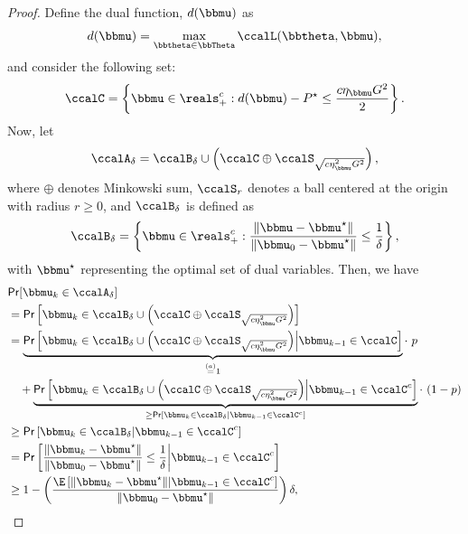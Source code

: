 \begin{proof}
Define the dual function, $d(\bbmu)$ as
\begin{align}\label{eq:def_dual_function}
d(\bbmu) = \max_{\bbtheta\in\bbTheta} \ccalL(\bbtheta, \bbmu),
\end{align}
and consider the following set:
\begin{align}\label{eq:def_C}
\ccalC = \left\{\bbmu \in \reals_+^c : d(\bbmu) - P^{\star} \leq \frac{c\eta_{\bbmu}G^2}{2} \right\}.
\end{align}
Now, let
\begin{align}
\ccalA_{\delta} = \ccalB_{\delta} \cup \left(\ccalC \oplus \ccalS_{\sqrt{c\eta_{\bbmu}^2 G^2}}\right),
\end{align}
where $\oplus$ denotes Minkowski sum, $\ccalS_r$ denotes a ball centered at the origin with radius $r\geq0$, and $\ccalB_{\delta}$ is defined as
\begin{align}
\ccalB_{\delta} = \left\{\bbmu \in \reals_+^c : \frac{\| \bbmu - \bbmu^{\star} \|}{\| \bbmu_0 - \bbmu^{\star}\|} \leq \frac{1}{\delta} \right\},
\end{align}
with $\bbmu^{\star}$ representing the optimal set of dual variables. Then, we have
\begin{align}
&\mathsf{Pr}[\bbmu_k \in \ccalA_{\delta}] \nonumber \\
& = \mathsf{Pr}\left[\bbmu_k \in \ccalB_{\delta} \cup \left(\ccalC \oplus \ccalS_{\sqrt{c\eta_{\bbmu}^2 G^2}}\right) \right] \\
& = \underbrace{\mathsf{Pr}\left[\bbmu_k \in \ccalB_{\delta} \cup \left(\ccalC \oplus \ccalS_{\sqrt{c\eta_{\bbmu}^2 G^2}}\right) \middle| \bbmu_{k-1}\in\ccalC \right]}_{\overset{(a)}{=}1} \cdot \ p \nonumber \\
& \quad + \underbrace{\mathsf{Pr}\left[\bbmu_k \in \ccalB_{\delta} \cup \left(\ccalC \oplus \ccalS_{\sqrt{c\eta_{\bbmu}^2 G^2}}\right) \middle| \bbmu_{k-1}\in\ccalC^c \right]}_{\geq \mathsf{Pr}\left[\bbmu_k \in \ccalB_{\delta}  \middle| \bbmu_{k-1}\in\ccalC^c \right]} \cdot \ (1-p) \nonumber \\
& \geq \mathsf{Pr}\left[\bbmu_k \in \ccalB_{\delta}  \middle| \bbmu_{k-1}\in\ccalC^c \right] \\
& = \mathsf{Pr}\left[\frac{\| \bbmu_k - \bbmu^{\star} \|}{\| \bbmu_0 - \bbmu^{\star}\|} \leq \frac{1}{\delta}  \middle| \bbmu_{k-1}\in\ccalC^c \right] \\
& \geq 1 - \left( \frac{\E\left[\| \bbmu_k - \bbmu^{\star} \| \middle| \bbmu_{k-1}\in\ccalC^c\right]}{\| \bbmu_0 - \bbmu^{\star}\|} \right) \delta,

\end{align}
\end{proof}
